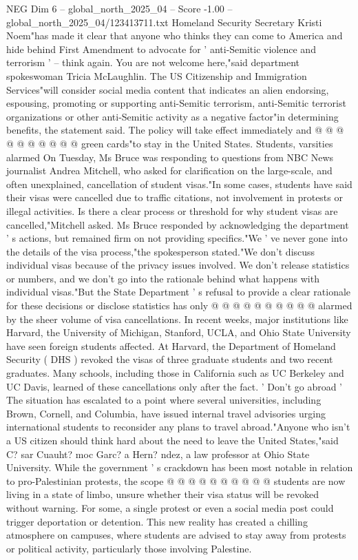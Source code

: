 \begin{textsample}{NEG Dim 6 – global\_north\_2025\_04 – Score -1.00 – global\_north\_2025\_04/123413711.txt}
Homeland Security Secretary Kristi Noem"has made it clear that anyone who thinks they can come to America and hide behind First Amendment to advocate for ' anti-Semitic violence and terrorism ' -- think again.
You are not welcome here,"said department spokeswoman Tricia McLaughlin.
The US Citizenship and Immigration Services"will consider social media content that indicates an alien endorsing, espousing, promoting or supporting anti-Semitic terrorism, anti-Semitic terrorist organizations or other anti-Semitic activity as a negative factor"in determining benefits, the statement said.
The policy will take effect immediately and @ @ @ @ @ @ @ @ @ @ green cards"to stay in the United States.
Students, varsities alarmed On Tuesday, Ms Bruce was responding to questions from NBC News journalist Andrea Mitchell, who asked for clarification on the large-scale, and often unexplained, cancellation of student visas."In some cases, students have said their visas were cancelled due to traffic citations, not involvement in protests or illegal activities.
Is there a clear process or threshold for why student visas are cancelled,"Mitchell asked.
Ms Bruce responded by acknowledging the department ' s actions, but remained firm on not providing specifics."We ' ve never gone into the details of the visa process,"the spokesperson stated."We don't discuss individual visas because of the privacy issues involved.
We don't release statistics or numbers, and we don't go into the rationale behind what happens with individual visas."But the State Department ' s refusal to provide a clear rationale for these decisions or disclose statistics has only @ @ @ @ @ @ @ @ @ @ alarmed by the sheer volume of visa cancellations.
In recent weeks, major institutions like Harvard, the University of Michigan, Stanford, UCLA, and Ohio State University have seen foreign students affected.
At Harvard, the Department of Homeland Security ( DHS ) revoked the visas of three graduate students and two recent graduates.
Many schools, including those in California such as UC Berkeley and UC Davis, learned of these cancellations only after the fact. ' Don't go abroad ' The situation has escalated to a point where several universities, including Brown, Cornell, and Columbia, have issued internal travel advisories urging international students to reconsider any plans to travel abroad."Anyone who isn't a US citizen should think hard about the need to leave the United States,"said C? sar Cuauht? moc Garc? a Hern? ndez, a law professor at Ohio State University.
While the government ' s crackdown has been most notable in relation to pro-Palestinian protests, the scope @ @ @ @ @ @ @ @ @ @ students are now living in a state of limbo, unsure whether their visa status will be revoked without warning.
For some, a single protest or even a social media post could trigger deportation or detention.
This new reality has created a chilling atmosphere on campuses, where students are advised to stay away from protests or political activity, particularly those involving Palestine.

\end{textsample}
